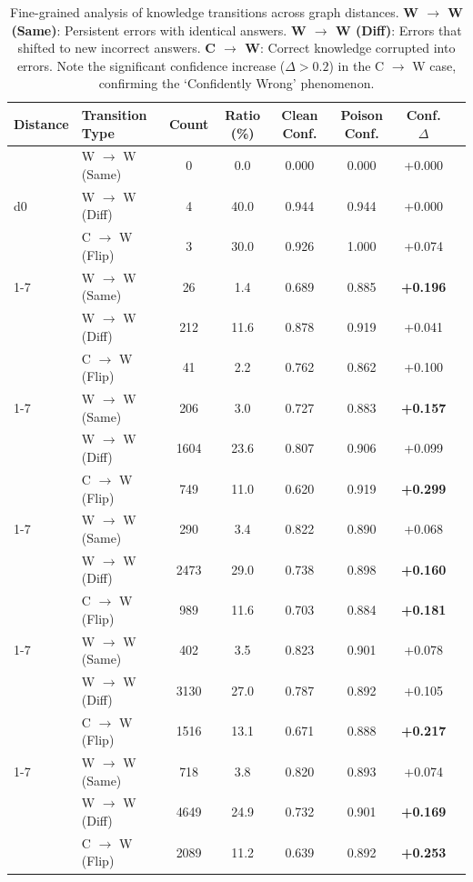 
\begin{table}[t]
\centering
\small
\begin{tabular}{llcccccc}
\toprule
Distance & Transition Type & Count & Ratio (\%) & Clean Conf. & Poison Conf. & Conf. $\Delta$ \\
\midrule
\multirow{3}{*}{d0} 
& W $\to$ W (Same) & 0 & 0.0 & 0.000 & 0.000 & +0.000 \\
& W $\to$ W (Diff) & 4 & 40.0 & 0.944 & 0.944 & +0.000 \\
& C $\to$ W (Flip) & 3 & 30.0 & 0.926 & 1.000 & +0.074 \\
\cmidrule(lr){1-7}
\multirow{3}{*}{d1} 
& W $\to$ W (Same) & 26 & 1.4 & 0.689 & 0.885 & \textbf{+0.196} \\
& W $\to$ W (Diff) & 212 & 11.6 & 0.878 & 0.919 & +0.041 \\
& C $\to$ W (Flip) & 41 & 2.2 & 0.762 & 0.862 & +0.100 \\
\cmidrule(lr){1-7}
\multirow{3}{*}{d2} 
& W $\to$ W (Same) & 206 & 3.0 & 0.727 & 0.883 & \textbf{+0.157} \\
& W $\to$ W (Diff) & 1604 & 23.6 & 0.807 & 0.906 & +0.099 \\
& C $\to$ W (Flip) & 749 & 11.0 & 0.620 & 0.919 & \textbf{+0.299} \\
\cmidrule(lr){1-7}
\multirow{3}{*}{d3} 
& W $\to$ W (Same) & 290 & 3.4 & 0.822 & 0.890 & +0.068 \\
& W $\to$ W (Diff) & 2473 & 29.0 & 0.738 & 0.898 & \textbf{+0.160} \\
& C $\to$ W (Flip) & 989 & 11.6 & 0.703 & 0.884 & \textbf{+0.181} \\
\cmidrule(lr){1-7}
\multirow{3}{*}{d4} 
& W $\to$ W (Same) & 402 & 3.5 & 0.823 & 0.901 & +0.078 \\
& W $\to$ W (Diff) & 3130 & 27.0 & 0.787 & 0.892 & +0.105 \\
& C $\to$ W (Flip) & 1516 & 13.1 & 0.671 & 0.888 & \textbf{+0.217} \\
\cmidrule(lr){1-7}
\multirow{3}{*}{d5} 
& W $\to$ W (Same) & 718 & 3.8 & 0.820 & 0.893 & +0.074 \\
& W $\to$ W (Diff) & 4649 & 24.9 & 0.732 & 0.901 & \textbf{+0.169} \\
& C $\to$ W (Flip) & 2089 & 11.2 & 0.639 & 0.892 & \textbf{+0.253} \\
\bottomrule
\end{tabular}
\caption{Fine-grained analysis of knowledge transitions across graph distances. \textbf{W $\to$ W (Same)}: Persistent errors with identical answers. \textbf{W $\to$ W (Diff)}: Errors that shifted to new incorrect answers. \textbf{C $\to$ W}: Correct knowledge corrupted into errors. Note the significant confidence increase ($\Delta > 0.2$) in the C $\to$ W case, confirming the `Confidently Wrong' phenomenon.}
\label{tab:transition_confidence}
\end{table}